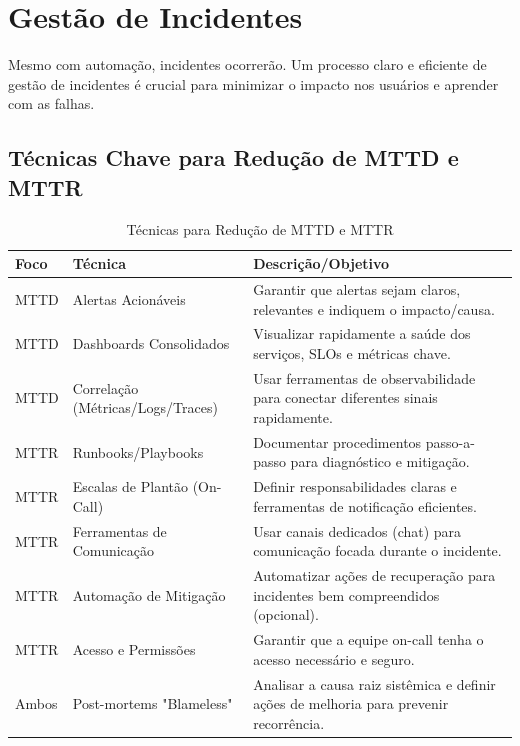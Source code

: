 \section{Gestão de Incidentes}
\label{sec:gestao-incidentes}

Mesmo com automação, incidentes ocorrerão. Um processo claro e eficiente de gestão de incidentes é crucial para minimizar o impacto nos usuários e aprender com as falhas.

\subsection{Técnicas Chave para Redução de MTTD e MTTR}
\label{subsec:mttd-mttr}

\begin{table}[htbp]
    \centering
    \caption{Técnicas para Redução de MTTD e MTTR}
    \label{tab:mttd-mttr}
    \begin{tabularx}{\textwidth}{llX} %
        \toprule
        \textbf{Foco} & \textbf{Técnica} & \textbf{Descrição/Objetivo} \\
        \midrule
        MTTD & Alertas Acionáveis & Garantir que alertas sejam claros, relevantes e indiquem o impacto/causa. \\
        MTTD & Dashboards Consolidados & Visualizar rapidamente a saúde dos serviços, SLOs e métricas chave. \\
        MTTD & Correlação (Métricas/Logs/Traces) & Usar ferramentas de observabilidade para conectar diferentes sinais rapidamente. \\
        MTTR & Runbooks/Playbooks & Documentar procedimentos passo-a-passo para diagnóstico e mitigação. \\
        MTTR & Escalas de Plantão (On-Call) & Definir responsabilidades claras e ferramentas de notificação eficientes. \\
        MTTR & Ferramentas de Comunicação & Usar canais dedicados (chat) para comunicação focada durante o incidente. \\
        MTTR & Automação de Mitigação & Automatizar ações de recuperação para incidentes bem compreendidos (opcional). \\
        MTTR & Acesso e Permissões & Garantir que a equipe on-call tenha o acesso necessário e seguro. \\
        Ambos & Post-mortems "Blameless" & Analisar a causa raiz sistêmica e definir ações de melhoria para prevenir recorrência. \\
        \bottomrule
    \end{tabularx}
\end{table}

